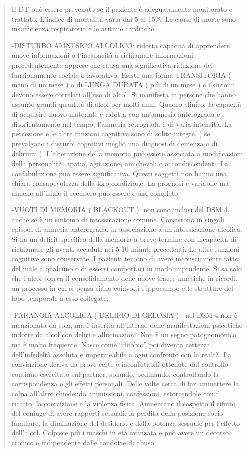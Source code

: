 \documentclass[]{article}
\begin{document}
\begin{quote}
Il DT può essere prevenuto se il paziente è adeguatamente monitorato e
trattato. L'indice di mortalità varia dal 5 al 15\%. Le cause di morte
sono insufficienza respiratoria e le aritmie cardiache.

-DISTURBO AMNESICO ALCOLICO: ridotta capacità di apprendere nuove
informazioni o l'incapacità a richiamare informazioni precedentemente
apprese che causa una significativa riduzione del funzionamento sociale
o lavorativo. Esiste una forma TRANSITORIA ( meno di un mese ) o di
LUNGA DURATA ( più di un mese ) e i sintomi devono essere correlati
all'uso di alcol. Si manifesta in persone che hanno assunto grandi
quantità di alcol per molti anni. Quadro clinico: la capacità di
acquisire nuovo materiale è ridotta con un'amnesia anterograda e
disorientamento nel tempo, l'amnesia retrograda è di varia intensità. La
percezione e le altre funzioni cognitive sono di solito integre. ( se
prevalgono i disturbi cognitivi meglio una diagnosi di demenza o di
delirium ). L'alterazione della memoria può essere associata a
modificazioni della personalità: apatia, agitazione, amichevoli o
accondiscendenti. La confabulazione può essere significativa. Questi
soggetti non hanno una chiara consapevolezza della loro condizione. La
prognosi è variabile ma almeno all'inizio il recupero può essere quasi
completo.

-VUOTI DI MEMORIA ( BLACKOUT ): non sono inclusi del DSM 4, anche se è
un sintomo di intossicazione comune. Consistono in singoli episodi di
amnesia anterograda, in associazione a un'intossicazione alcolica. Si ha
un deficit specifico della memoria a breve termine con incapacità di
richiamare gli aventi accaduti nei 5-10 minuti precedenti. Le altre
funzioni cognitive sono conservate. I pazienti temono di avere
inconsciamente fatto del male a qualcuno o di essersi comportati in modo
imprudente. Si sa solo che l'alcol blocca il consolidamento delle nuove
tracce mnesiche in ricordi, un processo in cui si pensa siano coinvolti
l'ippocampo e le strutture del lobo temporale a esso collegate.

-PARANOIA ALCOLICA ( DELIRIO DI GELOSIA ) : nel DSM 4 non è menzionata
da sola, ma è inserita all'interno delle manifestazioni psicotiche
indotte da alcol con deliri e allucinazioni. Non è un segno
patognomonico ma è molto frequente. Nasce come ``dubbio'' poi diventa
certezza dell'infedeltà assoluta e impermeabile a ogni confronto con la
realtà. La convinzione deriva da prove certe e inconfutabili ottenute
dal controllo continuo esercitato sul partner, spiando, pedinando,
controllando la corrispondenza e gli effetti personali. Delle volte
cerca di far ammettere la colpa all'altro chiedendo ammissioni,
confessioni, estorcendole con il ricatto, la coercizione e la violenza
fisica. Aumentano il sospetto il rifiuto del coniuge di avere rapporti
sessuali, la perdita della posizione socio-familiare, la diminuzione del
desiderio e della potenza sessuale per l'effetto dell'alcol. Colpisce
più i maschi in età avanzata e può avere un decorso cronico e
indipendente dalle condotte di abuso.


\end{quote}
\end{document}
